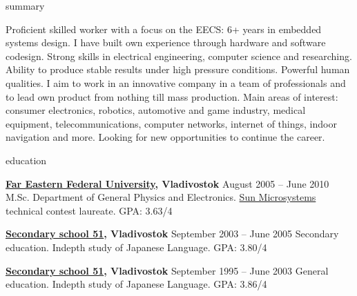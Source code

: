 \documentclass{template}
\begin{document}

\begin{rSection}{summary}

Proficient skilled worker with a focus on the EECS: 6+ years in embedded systems design. I have built own experience
through hardware and software codesign. Strong skills in electrical engineering, computer science and researching. Ability to
produce stable results under high pressure conditions. Powerful human qualities. I aim to work in an innovative company in a team
of professionals and to lead own product from nothing till mass production. Main areas of interest: consumer electronics, robotics,
automotive and game industry, medical equipment, telecommunications, computer networks, internet of things, indoor navigation and more.
Looking for new opportunities to continue the career.

\end{rSection}


\begin{rSection}{education}

{\bf \href{https://www.dvfu.ru/en/}{Far Eastern Federal University}, Vladivostok} \hfill {August 2005 -- June 2010} \newline
M.Sc. Department of General Physics and Electronics. \newline
\href{http://www.oracle.com}{Sun Microsystems} technical contest laureate. \newline
GPA: 3.63/4

{\bf \href{http://www.school51.pupils.ru}{Secondary school 51}, Vladivostok} \hfill {September 2003 -- June 2005} \newline
Secondary education. \newline
Indepth study of Japanese Language. \newline
GPA: 3.80/4

{\bf \href{http://www.school51.pupils.ru}{Secondary school 51}, Vladivostok} \hfill {September 1995 -- June 2003} \newline
General education. \newline
Indepth study of Japanese Language. \newline
GPA: 3.86/4

\end{rSection}
\end{document}
